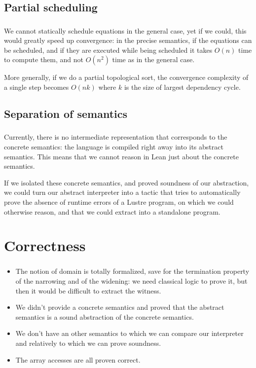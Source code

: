 \documentclass[professionalfonts]{beamer}
\makeatletter
\newcommand*{\currentname}{\@currentlabelname}
\def\ft{\frametitle{\currentname}}
\makeatother
\begin{document}
\subsection{Partial scheduling}
\begin{frame}
  \ft{} We cannot statically schedule equations in the general case, yet if we could, this would
  greatly speed up convergence: in the precise semantics, if the equations can be scheduled, and
  if they are executed while being scheduled it takes \(O(n)\) time to compute them, and not
  \(O(n^2)\) time as in the general case.

  More generally, if we do a partial topological sort, the convergence complexity of a single
  step becomes \(O(nk)\) where \(k\) is the size of largest dependency cycle.
\end{frame}

\subsection{Separation of semantics}
\begin{frame}
  \ft{}

  Currently, there is no intermediate representation that corresponds to the concrete semantics:
  the language is compiled right away into its abstract semantics.  This means that we cannot
  reason in Lean just about the concrete semantics.

  If we isolated these concrete semantics, and proved soundness of our abstraction, we could turn
  our abstract interpreter into a tactic that tries to automatically prove the absence of runtime
  errors of a Lustre program, on which we could otherwise reason, and that we could extract into
  a standalone program.
\end{frame}

\section{Correctness}
\begin{frame}
  \ft{}
  \begin{itemize}
  \item The notion of domain is totally formalized, save for the termination property of the
    narrowing and of the widening: we need classical logic to prove it, but then it would be
    difficult to extract the witness.
  \item We didn't provide a concrete semantics and proved that the abstract semantics is a sound
    abstraction of the concrete semantics.
  \item We don't have an other semantics to which we can compare our interpreter and relatively
    to which we can prove soundness.
  \item The array accesses are all proven correct.
  \end{itemize}
\end{frame}
\end{document}
